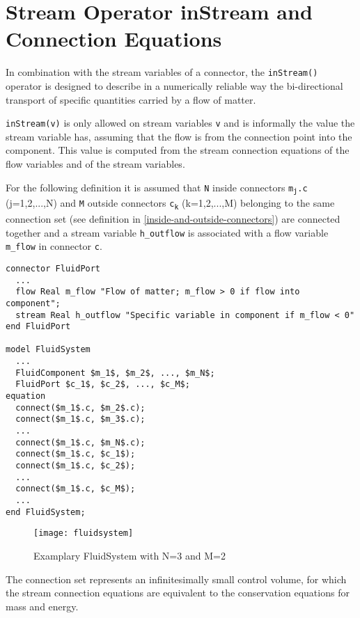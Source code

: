 \section{Stream Operator inStream and Connection Equations}

In combination with the stream variables of a connector, the
\lstinline!inStream()! operator is designed to describe in a numerically
reliable way the bi-directional transport of specific quantities carried
by a flow of matter.

\lstinline!inStream(v)! is only allowed on stream variables \lstinline!v! and is
informally the value the stream variable has, assuming that the flow is
from the connection point into the component. This value is computed
from the stream connection equations of the flow variables and of the
stream variables.

For the following definition it is assumed that \lstinline!N! inside connectors
\texttt{m\textsubscript{j}.c} (j=1,2,...,N) and \lstinline!M! outside connectors
\texttt{c\textsubscript{k}} (k=1,2,...,M) belonging to the same connection set
(see definition in \autoref{inside-and-outside-connectors}) are connected
together and a stream variable \lstinline!h_outflow! is associated with a flow
variable \lstinline!m_flow! in connector \lstinline!c!.

\begin{lstlisting}[language=modelica,mathescape=true]
connector FluidPort
  ...
  flow Real m_flow "Flow of matter; m_flow > 0 if flow into component";
  stream Real h_outflow "Specific variable in component if m_flow < 0"
end FluidPort

model FluidSystem
  ...
  FluidComponent $m_1$, $m_2$, ..., $m_N$;
  FluidPort $c_1$, $c_2$, ..., $c_M$;
equation
  connect($m_1$.c, $m_2$.c);
  connect($m_1$.c, $m_3$.c);
  ...
  connect($m_1$.c, $m_N$.c);
  connect($m_1$.c, $c_1$);
  connect($m_1$.c, $c_2$);
  ...
  connect($m_1$.c, $c_M$);
  ...
end FluidSystem;
\end{lstlisting}
\begin{figure}[H]
\caption{Examplary FluidSystem with N=3 and M=2}
\begin{center}
\texttt{[image: fluidsystem]}
\end{center}
\end{figure}

\begin{nonnormative}
The connection set represents an infinitesimally small control
volume, for which the stream connection equations are equivalent to the
conservation equations for mass and energy.
\end{nonnormative}

